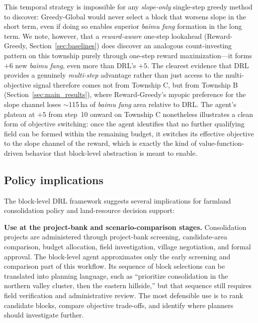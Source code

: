 \documentclass[preprint,12pt]{elsarticle}
\begin{document}
This temporal strategy is impossible for any \emph{slope-only} single-step greedy method to discover: Greedy-Global would never select a block that worsens slope in the short term, even if doing so enables superior \textit{baimu fang} formation in the long term. We note, however, that a \emph{reward-aware} one-step lookahead (Reward-Greedy, Section~\ref{sec:baselines}) does discover an analogous count-investing pattern on this township purely through one-step reward maximization---it forms $+6$ new \textit{baimu fang}, even more than DRL's $+5$. The clearest evidence that DRL provides a genuinely \emph{multi-step} advantage rather than just access to the multi-objective signal therefore comes not from Township C, but from Township B (Section~\ref{sec:main_results}), where Reward-Greedy's myopic preference for the slope channel loses $\sim$115\,ha of \textit{baimu fang} area relative to DRL. The agent's plateau at $+5$ from step~10 onward on Township C nonetheless illustrates a clean form of objective switching: once the agent identifies that no further qualifying field can be formed within the remaining budget, it switches its effective objective to the slope channel of the reward, which is exactly the kind of value-function-driven behavior that block-level abstraction is meant to enable.

\subsection{Policy implications}

The block-level DRL framework suggests several implications for farmland consolidation policy and land-resource decision support:

\textbf{Use at the project-bank and scenario-comparison stages.} Consolidation projects are administered through project-bank screening, candidate-area comparison, budget allocation, field investigation, village negotiation, and formal approval. The block-level agent approximates only the early screening and comparison part of this workflow. Its sequence of block selections can be translated into planning language, such as ``prioritize consolidation in the northern valley cluster, then the eastern hillside,'' but that sequence still requires field verification and administrative review. The most defensible use is to rank candidate blocks, compare objective trade-offs, and identify where planners should investigate further.
\end{document}
